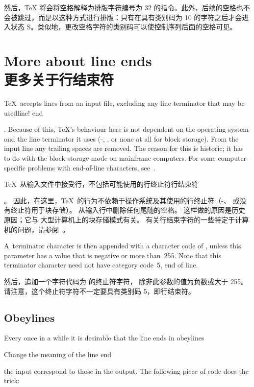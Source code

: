 然后，\TeX{} 将会将空格解释为排版字符编号为 32 的指令。此外，后续的空格也不会被跳过，而是以这种方式进行排版：只有在具有类别码为 10 的字符之后才会进入状态 {\italic S}。类似地，更改空格字符的类别码可以使控制序列后面的空格可见。


\section{More about line ends\\更多关于行结束符}

\TeX\ accepts lines from an input file, excluding any line
terminator that may be used\term line! end\par.
Because of this, \TeX's behaviour here is not dependent
on the operating system and the line terminator it uses (-,
, or none at all for block storage).
From the input line any trailing spaces are removed.
The reason for this is historic; it has to do with 
the block storage mode on  mainframe computers.
For some computer-specific problems with end-of-line
characters, see~\cite{B:ctrl-M}.

\TeX\ 从输入文件中接受行，不包括可能使用的行终止符\term 行结束符\par。
因此，在这里，\TeX\ 的行为不依赖于操作系统及其使用的行终止符（-、 或没有终止符用于块存储）。
从输入行中删除任何尾随的空格。
这样做的原因是历史原因；它与  大型计算机上的块存储模式有关。
有关行结束字符的一些特定于计算机的问题，请参阅~\cite{B:ctrl-M}。

A~terminator character is then appended
with a character code of , 
unless this parameter has a value that
is negative or more than~255. 
Note that this terminator character
need not have category code~5, end of line.

然后，追加一个字符代码为  的终止符字符，
除非此参数的值为负数或大于 255。
请注意，这个终止符字符不一定要具有类别码 5，即行结束符。

\subsection{Obeylines}

Every once in a while it is desirable that the line ends in
%
\cstoidx obeylines\par\howto Change the meaning of the line end\par
the input correspond to those in the output.
The following piece of code does the trick:

